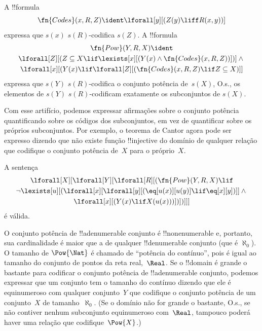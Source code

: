 \documentclass[../../../include/open-logic-section]{subfiles}
\begin{document}
\begin{prop}
A !!{formula}
  \[
  \fn{Codes}(x, R, Z) \ident \lforall[y][(Z(y) \liff
    R(x, y))]
  \]
expressa que $s(x)$ $s(R)$-codifica $s(Z)$. A
!!{formula}
\begin{multline*}
  \fn{Pow}(Y, R, X) \ident \\
  \lforall[Z][(Z \subseteq X \lif \lexists[x][(Y(x) \land
    \fn{Codes}(x, R, Z))])] \land {} \\ \lforall[x][(Y(x) \lif
  \lforall[Z][(\fn{Codes}(x, R, Z) \lif Z \subseteq X)]]
\end{multline*}
expressa que $s(Y)$ $s(R)$-codifica o conjunto potência de~$s(X)$, O.s.\@,
os elementos de $s(Y)$ $s(R)$-codificam exatamente os subconjuntos de
$s(X)$.
\end{prop}

\begin{explain}
Com esse artifício, podemos expressar afirmações sobre o conjunto potência
quantificando sobre os códigos dos subconjuntos, em vez de quantificar sobre
os próprios subconjuntos. Por exemplo, o teorema de Cantor agora pode ser
expresso dizendo que não existe função !!{injective} do domínio de qualquer
relação que codifique o conjunto potência de~$X$ para o próprio~$X$.
\end{explain}

\begin{prop}
A sentença
\begin{multline*}
  \lforall[X][\lforall[Y][\lforall[R][(\fn{Pow}(Y, R, X) \lif \\
      \lnot \lexists[u][(\lforall[x][\lforall[y][(\eq[u(x)][u(y)] \lif
            \eq[x][y])]] \land {}\\
        \lforall[x][(Y(x) \lif X(u(x)))])])]]]
\end{multline*}
é válida.
\end{prop}

\begin{explain}
O conjunto potência de !!a{denumerable} conjunto é !!{nonenumerable} e,
portanto, sua cardinalidade é maior que a de qualquer !!{denumerable}
conjunto (que é $\aleph_0$). O tamanho de $\Pow{\Nat}$ é chamado de
``potência do contínuo'', pois é igual ao tamanho do conjunto de pontos da
reta real,~$\Real$. Se o !!{domain} é grande o bastante para codificar o
conjunto potência de !!a{denumerable} conjunto, podemos expressar que um
conjunto tem o tamanho do contínuo dizendo que ele é equinumeroso com
qualquer conjunto~$Y$ que codifique o conjunto potência de um conjunto~$X$
de tamanho~$\aleph_0$. (Se o domínio não for grande o bastante, O.s.\@, se
não contiver nenhum subconjunto equinumeroso com~$\Real$, tampouco poderá
haver uma relação que codifique~$\Pow{X}$.)
\end{explain}
\end{document}
